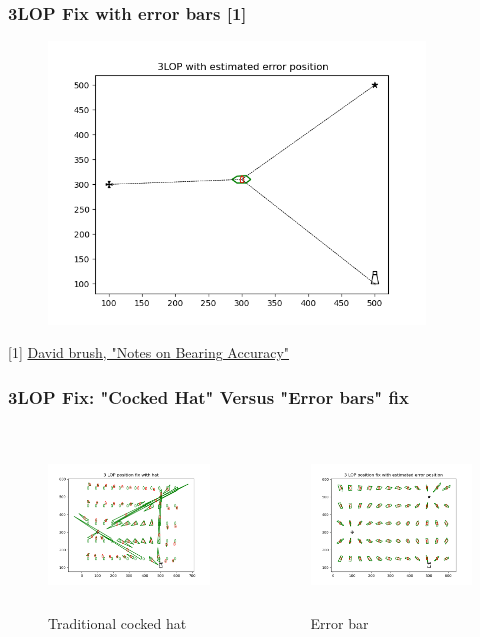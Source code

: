 \documentclass{beamer}
\begin{document}
\begin{frame}
    \frametitle{3LOP Fix with error bars [1]}
    \begin{figure}[h]
    \centering
    \includegraphics[width=10cm]{./pictures/3LOP_estim.png}
    \end{figure}

[1] \href{https://www.starpath.com/resources2/Bearing_Fix_Accuracy.pdf}{David brush, "Notes on Bearing Accuracy"}

\end{frame}


\begin{frame}
    \frametitle{3LOP Fix: "Cocked Hat" Versus "Error bars" fix}
    \begin{columns}
        \begin{figure}[h]
        \caption{Traditional cocked hat}
        \centering
        \includegraphics[height=4.5cm]{./pictures/3LOP_hat2.png}
        \end{figure}
    
        \begin{figure}[h]
        \caption{Error bar }
        \centering
        \includegraphics[height=4.5cm]{./pictures/3LOP_estim2.png}
        \end{figure}
    \end{columns}
\end{frame}
\end{document}
